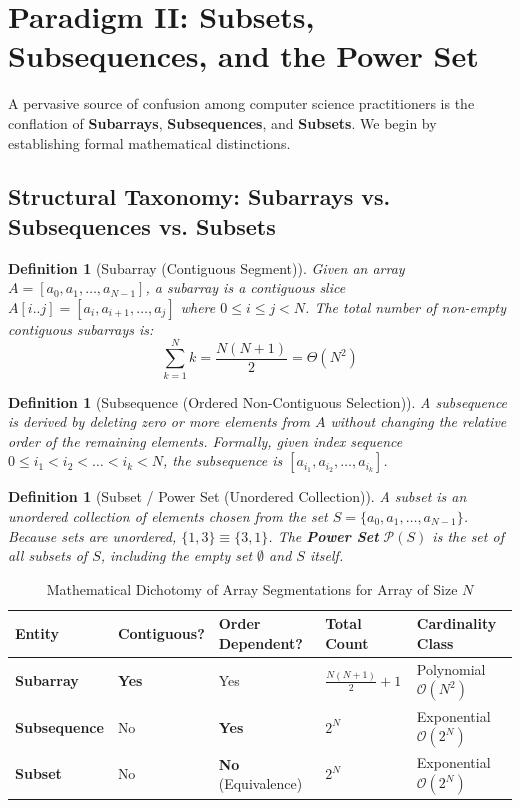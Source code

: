 \documentclass[10pt,journal,compsoc,onecolumn]{IEEEtran}
\newtheorem{definition}[theorem]{Definition}
\begin{document}
\section{Paradigm II: Subsets, Subsequences, and the Power Set}
\label{sec:subsets}

A pervasive source of confusion among computer science practitioners is the conflation of \textbf{Subarrays}, \textbf{Subsequences}, and \textbf{Subsets}. We begin by establishing formal mathematical distinctions.

\subsection{Structural Taxonomy: Subarrays vs. Subsequences vs. Subsets}
\begin{definition}[Subarray (Contiguous Segment)]
Given an array $A = [a_0, a_1, \dots, a_{N-1}]$, a subarray is a contiguous slice $A[i..j] = [a_i, a_{i+1}, \dots, a_j]$ where $0 \le i \le j < N$. The total number of non-empty contiguous subarrays is:
\begin{equation}
\sum_{k=1}^N k = \frac{N(N+1)}{2} = \Theta(N^2)
\end{equation}
\end{definition}

\begin{definition}[Subsequence (Ordered Non-Contiguous Selection)]
A subsequence is derived by deleting zero or more elements from $A$ without changing the relative order of the remaining elements. Formally, given index sequence $0 \le i_1 < i_2 < \dots < i_k < N$, the subsequence is $[a_{i_1}, a_{i_2}, \dots, a_{i_k}]$.
\end{definition}

\begin{definition}[Subset / Power Set (Unordered Collection)]
A subset is an unordered collection of elements chosen from the set $S = \{a_0, a_1, \dots, a_{N-1}\}$. Because sets are unordered, $\{1, 3\} \equiv \{3, 1\}$. The \textbf{Power Set} $\mathcal{P}(S)$ is the set of all subsets of $S$, including the empty set $\emptyset$ and $S$ itself.
\end{definition}

\begin{table}[htbp]
\centering
\caption{Mathematical Dichotomy of Array Segmentations for Array of Size $N$}
\label{tab:segment_taxonomy}
\begin{tabular}{lllll}
\toprule
Entity & Contiguous? & Order Dependent? & Total Count & Cardinality Class \\
\midrule
\textbf{Subarray} & \textbf{Yes} & Yes & $\frac{N(N+1)}{2} + 1$ & Polynomial $\mathcal{O}(N^2)$ \\
\textbf{Subsequence} & No & \textbf{Yes} & $2^N$ & Exponential $\mathcal{O}(2^N)$ \\
\textbf{Subset} & No & \textbf{No} (Equivalence) & $2^N$ & Exponential $\mathcal{O}(2^N)$ \\
\bottomrule
\end{tabular}
\end{table}
\end{document}
